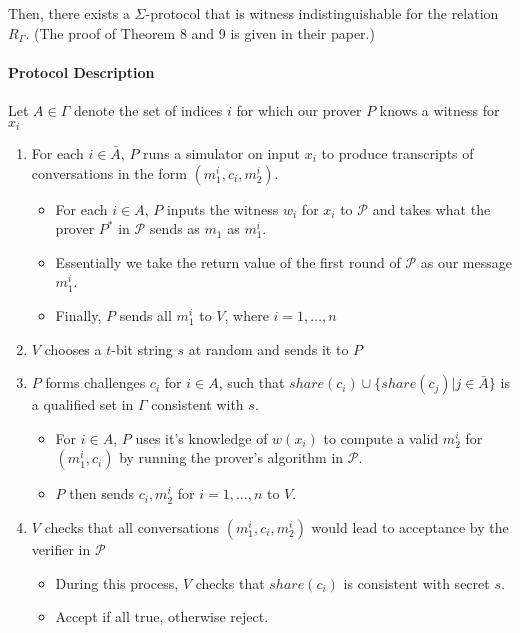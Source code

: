 Then, there exists a $\Sigma$-protocol that is witness indistinguishable for the relation $R_\Gamma$. (The proof of Theorem 8 and 9 is given in their paper.)

\paragraph{Protocol Description}
Let $A \in \Gamma$ denote the set of indices $i$ for which our prover $P$ knows a witness for $x_i$

\begin{enumerate}
    \item For each $i \in \bar A$, $P$ runs a simulator on input $x_i$ to produce transcripts of conversations in the form $(m_1^i, c_i, m_2^i)$.
    \begin{itemize}
        \item For each $i \in A$, $P$ inputs the witness $w_i$ for $x_i$ to $\mathcal P$ and takes what the prover $P^*$ in $\mathcal P$ sends as $m_1$ as $m_1^i$.
        \item Essentially we take the return value of the first round of $\mathcal P$ as our message $m_1^i$.
        \item Finally, $P$ sends all $m_1^i$ to $V$, where $i = 1, \ldots, n$
    \end{itemize}
    \item $V$ chooses a $t$-bit string $s$ at random and sends it to $P$
    \item $P$ forms challenges $c_i$ for $i \in A$, such that $share(c_i) \cup \{share(c_j)|j \in \bar A\}$ is a qualified set in $\Gamma$ consistent with $s$.
    \begin{itemize}
        \item For $i \in A$, $P$ uses it's knowledge of $w(x_i)$ to compute a valid $m_2^i$ for $(m_1^i, c_i)$ by running the prover's algorithm in $\mathcal P$.
        \item $P$ then sends $c_i, m_2^i$ for $i = 1 ,\ldots, n$ to $V$. 
    \end{itemize}
    \item $V$ checks that all conversations $(m_1^i, c_i, m_2^i)$ would lead to acceptance by the verifier in $\mathcal P$
    \begin{itemize}
        \item During this process, $V$ checks that $share(c_i)$ is consistent with secret $s$.
        \item Accept if all true, otherwise reject. 
    \end{itemize}
\end{enumerate}

